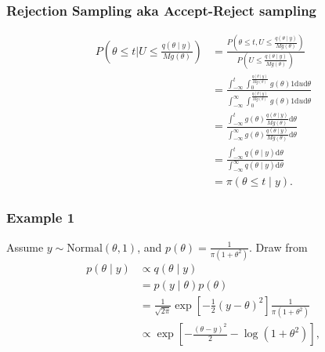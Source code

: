 \documentclass{beamer}
\begin{document}
\begin{frame}[fragile]
\frametitle{Rejection Sampling aka Accept-Reject sampling}
\begin{align*}
P\left( \theta \le t \bigg\rvert U \le \frac{q(\theta \mid y)}{M g(\theta) } \right) 
&= \frac{P\left( \theta \le t , U \le \frac{q(\theta \mid y)}{M g(\theta) } \right)}{P\left(U \le \frac{q(\theta \mid y)}{M g(\theta) } \right)} \\
&= \frac{\int_{-\infty}^t \int_0^{ \frac{q(\theta \mid y)}{M g(\theta) } }g(\theta)1 \text{d}u \text{d}\theta }{ \int_{-\infty}^{\infty} \int_0^{ \frac{q(\theta \mid y)}{M g(\theta) } }g(\theta)1 \text{d}u \text{d}\theta } \\
&= \frac{\int_{-\infty}^t g(\theta)\frac{q(\theta \mid y)}{M g(\theta) }  \text{d}\theta }{ \int_{-\infty}^{\infty} g(\theta)  \frac{q(\theta \mid y)}{M g(\theta) } \text{d}\theta } \\
&= \frac{\int_{-\infty}^t q(\theta \mid y)  \text{d}\theta }{ \int_{-\infty}^{\infty}  q(\theta \mid y)\text{d}\theta } \\
&= \pi(\theta \le t \mid y).
\end{align*}
\end{frame}


\begin{frame}[fragile]
\frametitle{Example 1}

Assume $y \sim \text{Normal}(\theta,1)$, and $p(\theta) = \frac{1}{\pi(1+\theta^2)}$. Draw from 
\begin{align*}
p(\theta \mid y) &\propto q(\theta\mid y) \\
&= p(y \mid \theta) p(\theta) \\
&= \frac{1}{\sqrt{2\pi}} \exp\left[-\frac{1}{2} (y-\theta)^2 \right] \frac{1}{\pi(1+\theta^2)} \\
&\propto \exp\left[-\frac{(\theta - y)^2}{2} - \log(1 + \theta^2) \right],
\end{align*}
\pause


\end{frame}
\end{document}
